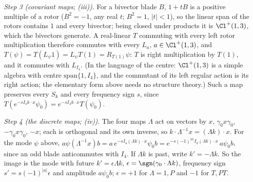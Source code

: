 \emph{Step 3 (covariant maps; (iii)).} For a bivector blade $B$, $1 + tB$ is a positive multiple of a rotor ($B^{2} = -1$, any real $t$; $B^{2} = 1$, $|t| < 1$), so the linear span of the rotors contains $1$ and every bivector; being closed under products it is $\Cl^{+}(1,3)$, which the bivectors generate. A real-linear $T$ commuting with every left rotor multiplication therefore commutes with every $L_{a}$, $a \in \Cl^{+}(1,3)$, and $T(\psi) = T(L_{\psi}1) = L_{\psi}T(1) = R_{T(1)}\psi$: $T$ is right multiplication by $T(1)$, and it commutes with $L_{I_{4}}$. (In the language of the centre: $\Cl^{+}(1,3)$ is a simple algebra with centre $\mathrm{span}\{1, I_{4}\}$, and the commutant of its left regular action is its right action; the elementary form above needs no structure theory.) Such a map preserves every $S_{k}$ and every frequency sign $s$, since $T(e^{-sI_{4}k\cdot x}\psi_{0}) = e^{-sI_{4}k\cdot x}T(\psi_{0})$.

\emph{Step 4 (the discrete maps; (iv)).} The four maps $\Lambda$ act on vectors by $x$, $\gamma_{0}x\gamma_{0}$, $-\gamma_{0}x\gamma_{0}$, $-x$; each is orthogonal and its own inverse, so $k\cdot\Lambda^{-1}x = (\Lambda k)\cdot x$. For the mode $\psi$ above, $a\psi(\Lambda^{-1}x)b = a\,e^{-sI_{4}(\Lambda k)\cdot x}\psi_{0}b = e^{-s(-1)^{|a|}I_{4}(\Lambda k)\cdot x}\,a\psi_{0}b$, since an odd blade anticommutes with $I_{4}$. If $\Lambda k$ is past, write $k' = -\Lambda k$. So the image is the mode with future $k' = \epsilon\Lambda k$, $\epsilon = \sgn(\gamma_{0}\cdot\Lambda k)$, frequency sign $s' = s(-1)^{|a|}\epsilon$ and amplitude $a\psi_{0}b$; $\epsilon = +1$ for $\Lambda = 1, P$ and $-1$ for $T, PT$.

